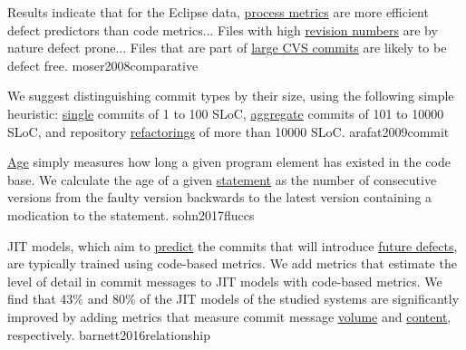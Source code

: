 \documentclass{article}
\begin{document}
  {Results indicate that for the Eclipse data, \ul{process metrics} are more efficient defect predictors than code metrics... Files with high \ul{revision numbers} are by nature defect prone... Files that are part of \ul{large CVS commits} are likely to be defect free.}
  {moser2008comparative}


  {We suggest distinguishing commit types by their size, using the following simple heuristic: \ul{single} commits of 1 to 100 SLoC, \ul{aggregate} commits of 101 to 10000 SLoC, and repository \ul{refactorings} of more than 10000 SLoC. }
  {arafat2009commit}

  {\ul{Age} simply measures how long a given program element has existed in the code base. We calculate the age of a given \ul{statement} as the number of consecutive versions from the faulty version backwards to the latest version containing a modication to the statement.}
  {sohn2017fluccs}


  {JIT models, which aim to \ul{predict} the commits that will introduce \ul{future defects}, are typically trained using code-based metrics. We add metrics that estimate the level of detail in commit messages to JIT models with code-based metrics. We find that 43\% and 80\% of the JIT models of the studied systems are significantly improved by adding metrics that measure commit message \ul{volume} and \ul{content}, respectively.}
  {barnett2016relationship}
\end{document}
